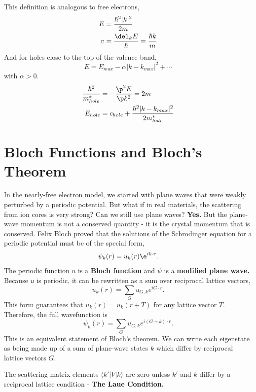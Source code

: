 \documentclass[a4paper, 11pt, normalem]{report}
\begin{document}
This definition is analogous to free electrons, 
\begin{align}
    E &= \frac{\hbar^2|k|^2}{2m} \\
    v &= \frac{\del_kE}{\hbar} = \frac{\hbar k}{m}
\end{align}
And for holes close to the top of the valence band,
\begin{equation}
    E = E_{max} - \alpha|k-k_{max}|^2 + \cdots
\end{equation}
with $\alpha > 0$.
\begin{align}
    \frac{\hbar^2}{m^*_{hole}} &= -\frac{\p^2 E}{\p k^2} = 2m \\
    E_{hole} &= c_{hole} + \frac{\hbar^2|k-k_{max}|^2}{2m^*_{hole}}
\end{align}

\section{Bloch Functions and Bloch's Theorem}
In the nearly-free electron model, we started with plane waves that were weakly perturbed by a periodic potential.
But what if in real materials, the scattering from ion cores is very strong?
Can we still use plane waves?
\textbf{Yes.}
But the plane-wave momentum is not a conserved quantity - it is the crystal momentum that is conserved.
Felix Bloch proved that the solutions of the Schrodinger equation for a periodic potential must be of the special form,
\begin{equation}
    \psi_k(r) = u_k(r)\e^{ik\cdot r}.
\end{equation}
The periodic function $u$ is a \textbf{Bloch function} and $\psi$ is a \textbf{modified plane wave.}
Because $u$ is periodic, it can be rewritten as a sum over reciprocal lattice vectors, 
\begin{equation}
    u_k(r) = \sum_G u_{G,k}e^{iG\cdot r}.
\end{equation}
This form guarantees that $u_k(r) = u_k(r+T)$ for any lattice vector $T$.
Therefore, the full wavefunction is
\begin{equation} 
    \psi_k(r) = \sum_G u_{G,k}e^{i(G+k)\cdot r}.
\end{equation}
This is an equivalent statement of Bloch's theorem.
We can write each eigenstate as being made up of a sum of plane-wave states $k$ which differ by reciprocal lattice vectors $G$.

The scattering matrix elements $\langle k'|V|k\rangle$ are zero unless $k'$ and $k$ differ by a reciprocal lattice condition - \textbf{The Laue Condition.}
\end{document}
